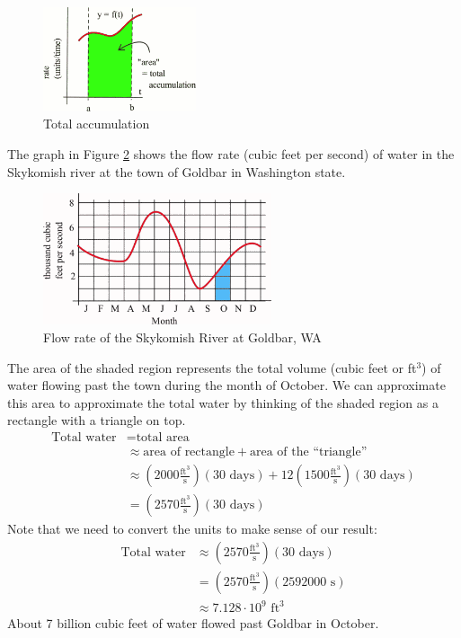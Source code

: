 \begin{figure}[!ht]
  \centering
    \includegraphics[width=0.4\textwidth]{img/chap5/image003.png}
    \caption{Total accumulation}
    \label{fig:5-2-accumulation}
\end{figure}
\begin{example}
The graph in Figure \ref{fig:5-2-river} shows the flow rate (cubic feet per second) of water in the Skykomish river at the town of Goldbar in Washington state.

\begin{figure}[!ht]
  \centering
    \includegraphics[width=0.6\textwidth]{img/chap5/image004.png}
    \caption{Flow rate of the Skykomish River at Goldbar, WA}
    \label{fig:5-2-river}
\end{figure}
\begin{solution}
The area of the shaded region represents the total volume (cubic feet or ft$^3$) of water flowing past the town during the month of October. We can approximate this area to approximate the total water by thinking of the shaded region as a rectangle with a triangle on top.
\begin{align*}
\text{Total water} &= \text{total area} \\
  &\approx \text{area of rectangle} + \text{area of the ``triangle''}\\
  &\approx  \left(2000 \frac{\text{ft}^3}{\text{s}}\right)(30 \text{ days}) + 12\left(1500\frac{\text{ft}^3}{\text{s}}\right)(30 \text{ days})\\
  &= \left(2570 \frac{\text{ft}^3}{\text{s}}\right)(30 \text{ days})
\end{align*}
Note that we need to convert the units to make sense of our result:
\begin{align*}
\text{Total water} &\approx  \left(2570 \frac{\text{ft}^3}{\text{s}}\right)(30 \text{ days}) \\
  &=\left(2570 \frac{\text{ft}^3}{\text{s}}\right)(2592000 \text{ s}) \\
  &\approx 7.128 \cdot 10^9 \text{ ft}^3
\end{align*}
About 7 billion cubic feet of water flowed past Goldbar in October.
\end{solution}\end{example}

